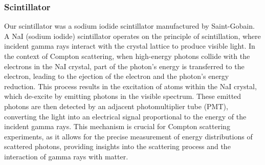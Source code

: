 \documentclass[10pt,letterpaper,onecolumn]{article}
\begin{document}
\subsubsection*{Scintillator}
Our scintillator was a sodium iodide scintillator manufactured by Saint-Gobain. A NaI (sodium iodide) scintillator operates on the principle of scintillation, where incident gamma rays interact with the crystal lattice to produce visible light. In the context of Compton scattering, when high-energy photons collide with the electrons in the NaI crystal, part of the photon's energy is transferred to the electron, leading to the ejection of the electron and the photon's energy reduction. This process results in the excitation of atoms within the NaI crystal, which de-excite by emitting photons in the visible spectrum. These emitted photons are then detected by an adjacent photomultiplier tube (PMT), converting the light into an electrical signal proportional to the energy of the incident gamma rays. This mechanism is crucial for Compton scattering experiments, as it allows for the precise measurement of energy distributions of scattered photons, providing insights into the scattering process and the interaction of gamma rays with matter.
\end{document}

